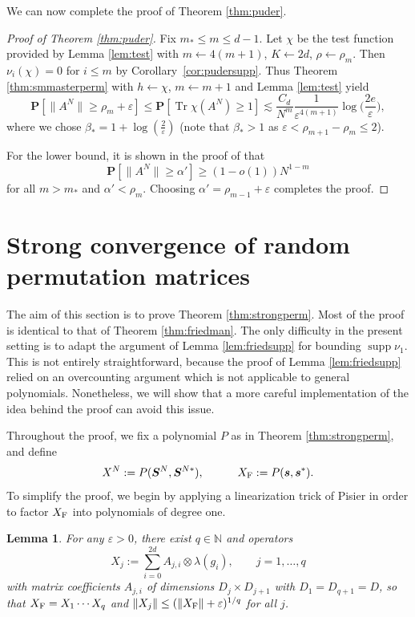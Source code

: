 \documentclass[10pt,reqno]{amsart}
\newtheorem{lem}[thm]{Lemma}
\theoremstyle{definition}
\theoremstyle{remark}
\numberwithin{equation}{section}
\numberwithin{figure}{section}
\numberwithin{table}{section}
\newcommand{\supp}{\mathop{\mathrm{supp}}}
\newcommand{\tr}{\mathop{\mathrm{Tr}}}
\begin{document}
We can now complete the proof of Theorem \ref{thm:puder}.

\begin{proof}[Proof of Theorem \ref{thm:puder}]
Fix $m_*\le m\le d-1$. Let $\chi$ be the test function provided by 
Lemma \ref{lem:test} with $m\leftarrow 4(m+1)$, $K\leftarrow 2d$,
$\rho\leftarrow\rho_m$. Then $\nu_i(\chi)=0$ for $i\le m$ by
Corollary~\ref{cor:pudersupp}. Thus Theorem 
\ref{thm:smmasterperm} with $h\leftarrow\chi$, 
$m\leftarrow m+1$ and Lemma \ref{lem:test}
yield
$$
	\mathbf{P}[\|A^N\| \ge
        \rho_m+\varepsilon] \le
	\mathbf{P}[\tr \chi(A^N)\ge 1] \lesssim
	\frac{C_d}{N^m}
	\frac{1}{\varepsilon^{4(m+1)}}
	\log
	\bigg(\frac{2e}{\varepsilon}\bigg),
$$
where we chose $\beta_*=1+\log(\frac{2}{\varepsilon})$ (note that 
$\beta_*>1$ as $\varepsilon<\rho_{m+1}-\rho_m\le 2$).

For the lower bound, it is shown in the proof of
\cite[Theorem 2.11]{Fri08} that
$$
	\mathbf{P}[\|A^N\| \ge \alpha'] \ge (1-o(1)) N^{1-m} 
$$
for all $m>m_*$ and $\alpha'<\rho_m$. Choosing
$\alpha'=\rho_{m-1}+\varepsilon$ completes the proof.
\end{proof}


\section{Strong convergence of random permutation matrices}
\label{sec:bc}

The aim of this section is to prove Theorem \ref{thm:strongperm}. Most of 
the proof is identical to that of Theorem \ref{thm:friedman}. The only 
difficulty in the present setting is to adapt the argument of Lemma 
\ref{lem:friedsupp} for bounding $\supp\nu_1$. This is not entirely 
straightforward, because the proof of Lemma \ref{lem:friedsupp} relied on 
an overcounting argument which is not applicable to general polynomials. 
Nonetheless, we will show that a more careful implementation of the idea 
behind the proof can avoid this issue.

Throughout the proof, we fix a polynomial $P$ as in Theorem 
\ref{thm:strongperm}, and define
$$
	X^N := P(\boldsymbol{S}^N,\boldsymbol{S}^{N*}),\qquad\quad
	X_{\rm F} := P(\boldsymbol{s},\boldsymbol{s}^*).
$$
To simplify the proof, we begin by applying a linearization trick of 
Pisier \cite{Pis18} in order to factor $X_{\rm F}$ into polynomials of 
degree one.

\begin{lem}
\label{lem:lin}
For any $\varepsilon>0$, there exist $q\in\mathbb{N}$ and operators
$$
	X_j := \sum_{i=0}^{2d} A_{j,i}\otimes \lambda(g_i),\qquad
	j=1,\ldots,q
$$
with matrix coefficients $A_{j,i}$ of dimensions $D_j\times D_{j+1}$ 
with $D_1=D_{q+1}=D$, so that
$X_{\rm F}=X_1\cdots X_q$ and $\|X_j\|\le (\|X_{\rm 
F}\|+\varepsilon)^{1/q}$ for all $j$.
\end{lem}
\end{document}
